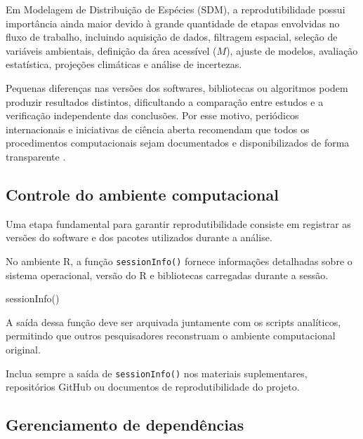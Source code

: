 Em Modelagem de Distribuição de Espécies (SDM), a reprodutibilidade possui
importância ainda maior devido à grande quantidade de etapas envolvidas no fluxo
de trabalho, incluindo aquisição de dados, filtragem espacial, seleção de
variáveis ambientais, definição da área acessível ($M$), ajuste de modelos,
avaliação estatística, projeções climáticas e análise de incertezas.

Pequenas diferenças nas versões dos softwares, bibliotecas ou algoritmos podem
produzir resultados distintos, dificultando a comparação entre estudos e a
verificação independente das conclusões. Por esse motivo, periódicos
internacionais e iniciativas de ciência aberta recomendam que todos os
procedimentos computacionais sejam documentados e disponibilizados de forma
transparente \citep{wilkinson2016fair, peng2011reproducible,
	sandve2013ten, zurell2020standard}.

\subsection{Controle do ambiente computacional}

Uma etapa fundamental para garantir reprodutibilidade consiste em registrar as
versões do software e dos pacotes utilizados durante a análise.

No ambiente R, a função \texttt{sessionInfo()} fornece informações detalhadas
sobre o sistema operacional, versão do R e bibliotecas carregadas durante a
sessão.

\begin{rcode}
	sessionInfo()
\end{rcode}

A saída dessa função deve ser arquivada juntamente com os scripts analíticos,
permitindo que outros pesquisadores reconstruam o ambiente computacional
original.

\begin{sdmpracticebox}
	Inclua sempre a saída de \texttt{sessionInfo()} nos materiais suplementares,
	repositórios GitHub ou documentos de reprodutibilidade do projeto.
\end{sdmpracticebox}

\subsection{Gerenciamento de dependências}

